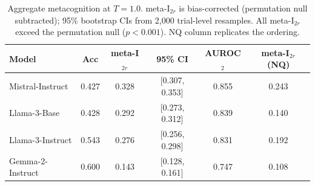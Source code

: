 \begin{table}[t]
\centering
\caption{Aggregate metacognition at $T{=}1.0$. meta-I$_{2r}$ is bias-corrected (permutation null subtracted); 95\% bootstrap CIs from 2{,}000 trial-level resamples. All meta-I$_{2r}$ exceed the permutation null ($p<0.001$). NQ column replicates the ordering.}
\label{tab:agg}
\small
\begin{tabular}{lccccc}
\toprule
\textbf{Model} & \textbf{Acc} & \textbf{meta-I$_{2r}$} & \textbf{95\% CI} & \textbf{AUROC$_2$} & \textbf{meta-I$_{2r}$ (NQ)} \\
\midrule
Mistral-Instruct & 0.427 & 0.328 & [0.307, 0.353] & 0.855 & 0.243 \\
Llama-3-Base & 0.428 & 0.292 & [0.273, 0.312] & 0.839 & 0.140 \\
Llama-3-Instruct & 0.543 & 0.276 & [0.256, 0.298] & 0.831 & 0.192 \\
Gemma-2-Instruct & 0.600 & 0.143 & [0.128, 0.161] & 0.747 & 0.108 \\
\bottomrule
\end{tabular}
\end{table}